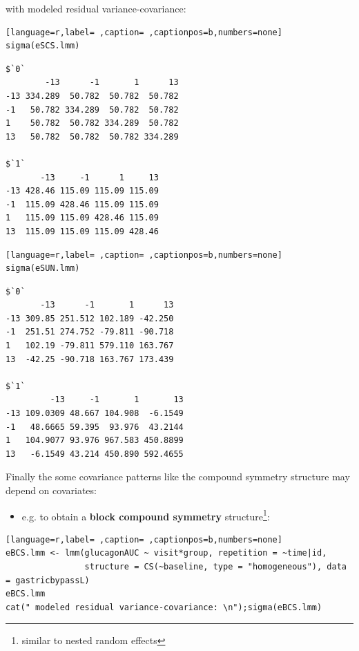 \documentclass[12pt]{article}
\begin{document}
with modeled residual variance-covariance:

\bigskip

\begin{minipage}{0.47\linewidth}
\begin{lstlisting}[language=r,label= ,caption= ,captionpos=b,numbers=none]
sigma(eSCS.lmm)
\end{lstlisting}

\begin{verbatim}
$`0`
        -13      -1       1      13
-13 334.289  50.782  50.782  50.782
-1   50.782 334.289  50.782  50.782
1    50.782  50.782 334.289  50.782
13   50.782  50.782  50.782 334.289

$`1`
       -13     -1      1     13
-13 428.46 115.09 115.09 115.09
-1  115.09 428.46 115.09 115.09
1   115.09 115.09 428.46 115.09
13  115.09 115.09 115.09 428.46
\end{verbatim}
\end{minipage}
\begin{minipage}{0.47\linewidth}
\begin{lstlisting}[language=r,label= ,caption= ,captionpos=b,numbers=none]
sigma(eSUN.lmm)
\end{lstlisting}

\begin{verbatim}
$`0`
       -13      -1       1      13
-13 309.85 251.512 102.189 -42.250
-1  251.51 274.752 -79.811 -90.718
1   102.19 -79.811 579.110 163.767
13  -42.25 -90.718 163.767 173.439

$`1`
         -13     -1       1       13
-13 109.0309 48.667 104.908  -6.1549
-1   48.6665 59.395  93.976  43.2144
1   104.9077 93.976 967.583 450.8899
13   -6.1549 43.214 450.890 592.4655
\end{verbatim}
\end{minipage}

\clearpage

\noindent Finally the some covariance patterns like the compound
symmetry structure may depend on covariates:
\begin{itemize}
\item e.g. to obtain a \textbf{block compound symmetry} structure\footnote{similar to
nested random effects}:
\end{itemize}
\begin{lstlisting}[language=r,label= ,caption= ,captionpos=b,numbers=none]
eBCS.lmm <- lmm(glucagonAUC ~ visit*group, repetition = ~time|id,
                structure = CS(~baseline, type = "homogeneous"), data = gastricbypassL)
eBCS.lmm
cat(" modeled residual variance-covariance: \n");sigma(eBCS.lmm)
\end{lstlisting}
\end{document}
